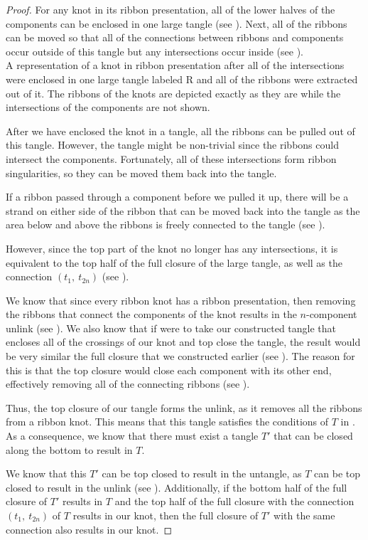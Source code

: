 \begin{paper}
\begin{proof}
For any knot in its ribbon presentation, all of the lower halves of the
components can be enclosed in one large tangle (see \figPresentation).
Next, all of the ribbons can be moved so that all of the connections between
ribbons and components occur outside of this tangle but any intersections occur
inside (see \figLowered).\\

{A representation of a knot in ribbon presentation after all of the
intersections were enclosed in one large tangle labeled R and all of the ribbons
were extracted out of it.
The ribbons of the knots are depicted exactly as they are while the
intersections of the components are not shown.}

After we have enclosed the knot in a tangle, all the ribbons can be pulled out
of this tangle.
However, the tangle might be non-trivial since the ribbons could intersect the
components.
Fortunately, all of these intersections form ribbon singularities, so they can
be moved them back into the tangle.

If a ribbon passed through a component before we pulled it up, there will be a
strand on either side of the ribbon that can be moved back into the tangle as
the area below and above the ribbons is freely connected to the tangle (see
\figTwisted).

However, since the top part of the knot no longer has any intersections, it is
equivalent to the top half of the full closure of the large tangle, as well as
the connection $(t_1,~t_{2n})$ (see \figFull).

We know that since every ribbon knot has a ribbon presentation, then removing
the ribbons that connect the components of the knot results in the $n$-component
unlink (see \figPresentation).
We also know that if were to take our constructed tangle that encloses all of
the crossings of our knot and top close the tangle, the result would be very
similar the full closure that we constructed earlier (see \figTop).
The reason for this is that the top closure would close each component with its
other end, effectively removing all of the connecting ribbons (see \figTwisted).

Thus, the top closure of our tangle forms the unlink, as it removes all the
ribbons from a ribbon knot.
This means that this tangle satisfies the conditions of $T$ in \lemTangles.
As a consequence, we know that there must exist a tangle $T'$ that can be closed
along the bottom to result in $T$.

We know that this $T'$ can be top closed to result in the untangle, as $T$ can
be top closed to result in the unlink (see \figLemma).
Additionally, if the bottom half of the full closure of $T'$ results in $T$ and
the top half of the full closure with the connection $(t_1,~t_{2n})$ of $T$
results in our knot, then the full closure of $T'$ with the same connection also
results in our knot.


\end{proof}
\end{paper}
